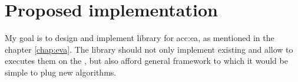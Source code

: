 \chapter{Proposed implementation}

My goal is to design and implement library for \acrlong{acc:ea}, as mentioned in the chapter \ref{chap:eva}. The library should not only implement existing  and allow to executes them on the \gpuns, but also afford general framework to which it would be simple to plug new algorithms.

